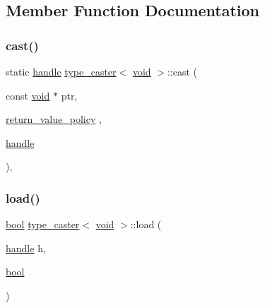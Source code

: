\subsection{Member Function Documentation}
\mbox{\label{classtype__caster_3_01void_01_4_a70b8f85942ed923f69e16fb949c22ea6}} 
\subsubsection{\texorpdfstring{cast()}{cast()}}
{\footnotesize\ttfamily static \mbox{\hyperlink{classhandle}{handle}} \mbox{\hyperlink{classtype__caster}{type\+\_\+caster}}$<$ \mbox{\hyperlink{_s_d_l__opengles2__gl2ext_8h_ae5d8fa23ad07c48bb609509eae494c95}{void}} $>$\+::cast (\begin{DoxyParamCaption}\item[{const \mbox{\hyperlink{_s_d_l__opengles2__gl2ext_8h_ae5d8fa23ad07c48bb609509eae494c95}{void}} $\ast$}]{ptr,  }\item[{\mbox{\hyperlink{detail_2common_8h_adde72ab1fb0dd4b48a5232c349a53841}{return\+\_\+value\+\_\+policy}}}]{,  }\item[{\mbox{\hyperlink{classhandle}{handle}}}]{ }\end{DoxyParamCaption})\hspace{0.3cm}{\ttfamily [inline]}, {\ttfamily [static]}}

\mbox{\label{classtype__caster_3_01void_01_4_a0059efa286541d97ac65bb84cd22b93d}} 
\subsubsection{\texorpdfstring{load()}{load()}}
{\footnotesize\ttfamily \mbox{\hyperlink{asdl_8h_af6a258d8f3ee5206d682d799316314b1}{bool}} \mbox{\hyperlink{classtype__caster}{type\+\_\+caster}}$<$ \mbox{\hyperlink{_s_d_l__opengles2__gl2ext_8h_ae5d8fa23ad07c48bb609509eae494c95}{void}} $>$\+::load (\begin{DoxyParamCaption}\item[{\mbox{\hyperlink{classhandle}{handle}}}]{h,  }\item[{\mbox{\hyperlink{asdl_8h_af6a258d8f3ee5206d682d799316314b1}{bool}}}]{ }\end{DoxyParamCaption})\hspace{0.3cm}{\ttfamily [inline]}}

